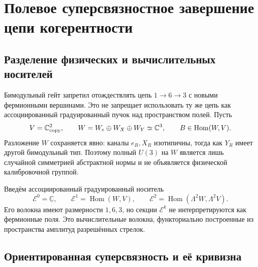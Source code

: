 \chapter{Полевое суперсвязностное завершение цепи когерентности}
\label{ch:v7-edge-coherence-field-space-superconnection-gate}

\section{Разделение физических и вычислительных носителей}

Бимодульный гейт запретил отождествлять цепь $1\to6\to3$ с новыми
фермионными вершинами. Это не запрещает использовать ту же цепь как
ассоциированный градуированный пучок над пространством полей. Пусть
\begin{equation}
 V=\mathbb C^2_{\rm copy},\qquad
 W=W_e\oplus W_X\oplus W_Y\simeq\mathbb C^3,
 \qquad B\in\operatorname{Hom}(W,V).
 \label{eq:v7-field-superconnection-arrow-bundle}
\end{equation}
Разложение $W$ сохраняется явно: каналы $e_R,X_R$ изотипичны, тогда как
$Y_R$ имеет другой бимодульный тип. Поэтому полный $U(3)$ на $W$ является
лишь случайной симметрией абстрактной нормы и не объявляется физической
калибровочной группой.

Введём ассоциированный градуированный носитель
\begin{equation}
 \mathcal E^0=\underline{\mathbb C},\qquad
 \mathcal E^1=\operatorname{Hom}(W,V),\qquad
 \mathcal E^2=\operatorname{Hom}(\Lambda^2W,\Lambda^2V).
 \label{eq:v7-field-superconnection-carrier}
\end{equation}
Его волокна имеют размерности $1,6,3$, но секции $\mathcal E^k$ не
интерпретируются как фермионные поля. Это вычислительные волокна,
функториально построенные из пространства амплитуд разрешённых стрелок.

\section{Ориентированная суперсвязность и её кривизна}

